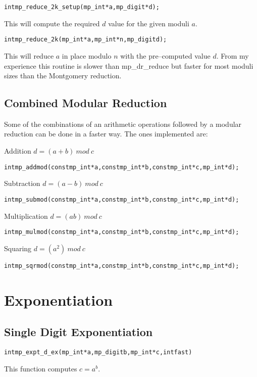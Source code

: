 \documentclass[synpaper]{book}
\def\mod{{\mathit\ mod\ }}
\begin{document}
\begin{alltt}
int mp_reduce_2k_setup(mp_int *a, mp_digit *d);
\end{alltt}

This will compute the required $d$ value for the given moduli $a$.

\begin{alltt}
int mp_reduce_2k(mp_int *a, mp_int *n, mp_digit d);
\end{alltt}

This will reduce $a$ in place modulo $n$ with the pre--computed value $d$.  From my experience this routine is
slower than mp\_dr\_reduce but faster for most moduli sizes than the Montgomery reduction.

\section{Combined Modular Reduction}

Some of the combinations of an arithmetic operations followed by a modular reduction can be done in a faster way. The ones implemented are:

Addition $d = (a + b) \mod c$
\begin{alltt}
int mp_addmod(const mp_int *a, const mp_int *b, const mp_int *c, mp_int *d);
\end{alltt}

Subtraction  $d = (a - b) \mod c$
\begin{alltt}
int mp_submod(const mp_int *a, const mp_int *b, const mp_int *c, mp_int *d);
\end{alltt}

Multiplication $d = (ab) \mod c$
\begin{alltt}
int mp_mulmod(const mp_int *a, const mp_int *b, const mp_int *c, mp_int *d);
\end{alltt}

Squaring  $d = (a^2) \mod c$
\begin{alltt}
int mp_sqrmod(const mp_int *a, const mp_int *b, const mp_int *c, mp_int *d);
\end{alltt}



\chapter{Exponentiation}
\section{Single Digit Exponentiation}
\begin{alltt}
int mp_expt_d_ex (mp_int * a, mp_digit b, mp_int * c, int fast)
\end{alltt}
This function computes $c = a^b$.
\end{document}
